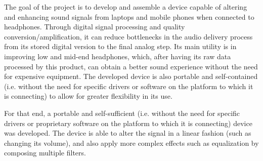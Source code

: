 
\begin{abstractutfpr}%
The goal of the project is to develop and assemble a device capable of altering and enhancing sound signals from laptops and mobile phones when connected to headphones. Through digital signal processing and quality conversion/amplification, it can reduce bottlenecks in the audio delivery process from its stored digital version to the final analog step. Its main utility is in improving low and mid-end headphones, which, after having its raw data processed by this product, can obtain a better sound experience without the need for expensive equipment. The developed device is also portable and self-contained (i.e. without the need for specific drivers or software on the platform to which it is connecting) to allow for greater flexibility in its use.

For that end, a portable and self-sufficient (i.e. without the need for specific drivers or proprietary software on the platform to which it is connecting) device was developed. The device is able to alter the signal in a linear fashion (such as changing its volume), and also apply more complex effects such as equalization by composing multiple filters.
\end{abstractutfpr}
